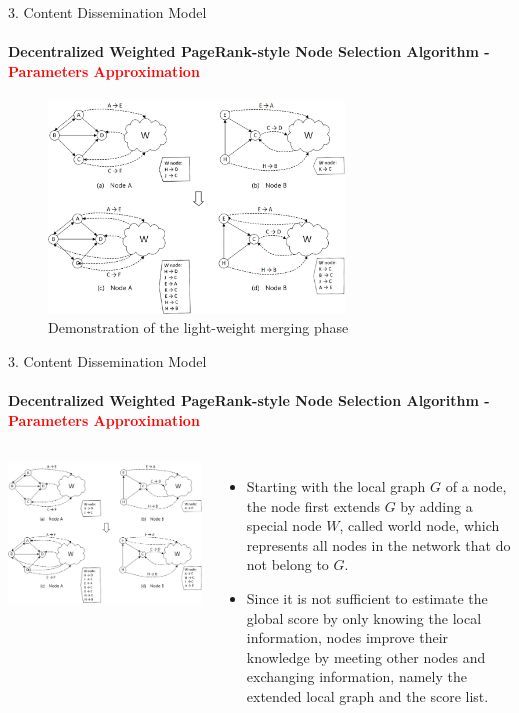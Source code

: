 \documentclass{beamer}		%
\begin{document}
\begin{frame}{3. Content Dissemination Model}
\framesubtitle{Decentralized Weighted PageRank-style Node Selection Algorithm - \textcolor{red}{Parameters Approximation}}
\begin{figure}
    \centering
    \includegraphics[width=0.7\textwidth]{Fig3.png}
    \caption{Demonstration of the light-weight merging phase}
    \label{fig:3}
\end{figure}
\end{frame}

\begin{frame}{3. Content Dissemination Model}
\framesubtitle{Decentralized Weighted PageRank-style Node Selection Algorithm - \textcolor{red}{Parameters Approximation}}
\begin{columns}
\includegraphics[scale=0.048]{Fig3.png}
\begin{itemize}
\item Starting with the local graph $G$ of a node, the node first extends $G$ by adding a special node $W$, called world node, which represents all nodes in the network that do not belong to $G$.
\item Since it is not sufficient to estimate the global score by only knowing the local information, nodes improve their knowledge by meeting other nodes and exchanging information, namely the extended local graph and the score list.
\end{itemize}
\end{columns}
\end{frame}
\end{document}
